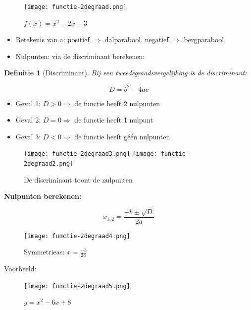\documentclass{article}
\newtheorem{theorem}{Definitie}[section]
\begin{document}
\begin{figure}[H]
    \centering
    \texttt{[image: functie-2degraad.png]}
    \caption{$f(x) = x^2 - 2x - 3$}
\end{figure}

\begin{itemize}
    \item Betekenis van a: positief $\Rightarrow$ dalparabool, negatief $\Rightarrow$ bergparabool
    \item Nulpunten: via de discriminant berekenen:
\end{itemize}

\begin{theorem}[Discriminant]
Bij een tweedegraadsvergelijking is de discriminant:

\begin{equation}
    D = b^2 - 4ac
\end{equation}
\end{theorem}

\begin{itemize}
    \item Geval 1: $D > 0 \Rightarrow$ de functie heeft 2 nulpunten
    \item Geval 2: $D = 0 \Rightarrow$ de functie heeft 1 nulpunt
    \item Geval 3: $D < 0 \Rightarrow$ de functie heeft géén nulpunten
\end{itemize}

\begin{figure}[H]
    \centering
    \texttt{[image: functie-2degraad3.png]}
    \texttt{[image: functie-2degraad2.png]}
    \caption{De discriminant toont de nulpunten}
\end{figure}

\textbf{Nulpunten berekenen:} 

\begin{equation}
    x_{1,2} = \frac{-b \pm \sqrt{D}}{2a}
\end{equation}

\begin{figure}[H]
    \centering
    \texttt{[image: functie-2degraad4.png]}
    \caption{Symmetrieas: $x = \frac{-b}{2a}$}
\end{figure}

Voorbeeld: 

\begin{figure}[H]
    \centering
    \texttt{[image: functie-2degraad5.png]}
    \caption{$y = x^2 - 6x + 8$}
\end{figure}
\end{document}
